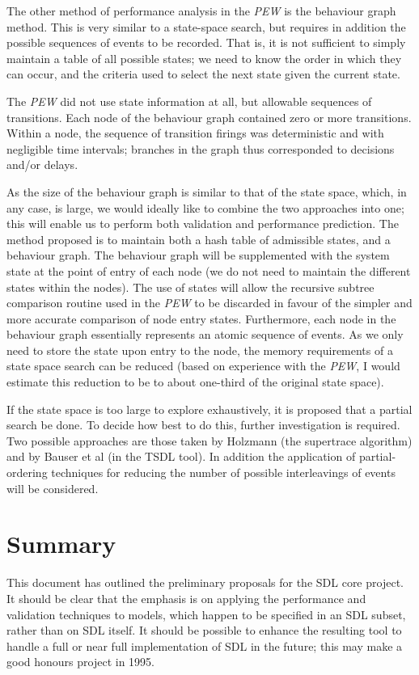 The other method of performance analysis in the {\em PEW} is the behaviour graph
method. This is very similar to a state-space search, but requires in
addition the possible sequences of events to be recorded. That is, it is
not sufficient to simply maintain a table of all possible states; we need
to know the order in which they can occur, and the criteria used to select
the next state given the current state.

The {\em PEW} did not use state information at all, but allowable sequences of
transitions. Each node of the behaviour graph contained zero or more
transitions. Within a node, the sequence of transition firings was
deterministic and with negligible time intervals; branches in the graph
thus corresponded to decisions and/or delays.

As the size of the behaviour graph is similar to that of the state space,
which, in any case, is large, we would ideally like to combine the two
approaches into one; this will enable us to perform both validation and
performance prediction. The method proposed is to maintain both a hash
table of admissible states, and a behaviour graph. The behaviour graph will
be supplemented with the system state at the point of entry of each node
(we do not need to maintain the different states within the nodes). The use
of states will allow the recursive subtree comparison routine used in the
{\em PEW} to be discarded in favour of the simpler and more accurate comparison
of node entry states. Furthermore, each node in the behaviour graph
essentially represents an atomic sequence of events. As we only need
to store the state upon entry to the node, the memory requirements of
a state space search can be reduced (based on experience with the
{\em PEW}, I would estimate this reduction to be to about one-third
of the original state space).

If the state space is too large to explore exhaustively, it is
proposed that a partial search be done. To decide how best to do
this, further investigation is required. Two possible approaches are
those taken by Holzmann (the supertrace algorithm) and by Bauser et
al (in the TSDL tool). In addition the application of
partial-ordering techniques for reducing the number of
possible interleavings of events will be considered.

\section{Summary}

This document has outlined the preliminary proposals for the SDL core
project. It should be clear that the emphasis is on applying the
performance and validation techniques to models, which happen to be
specified in an SDL subset, rather than on SDL itself. It should be
possible to enhance the resulting tool to handle a full or near full
implementation of SDL in the future; this may make a good honours
project in 1995.




